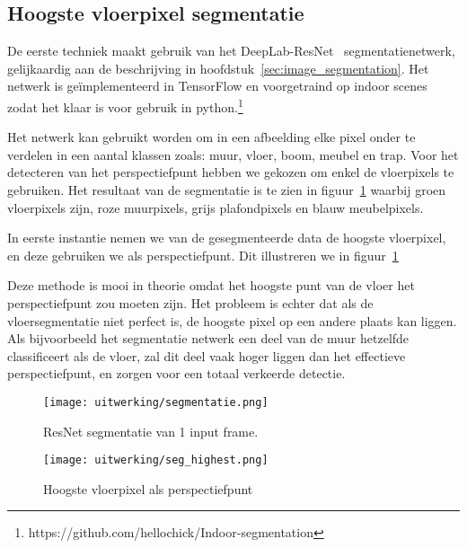 \subsection{Hoogste vloerpixel segmentatie}\label{sec:seg_highest}

De eerste techniek maakt gebruik van het DeepLab-ResNet~\cite{resnet101} segmentatienetwerk, gelijkaardig aan de beschrijving in hoofdstuk~\ref{sec:image_segmentation}.
Het netwerk is ge\"{i}mplementeerd in TensorFlow en voorgetraind op indoor scenes zodat het klaar is voor gebruik in python.\footnote{https://github.com/hellochick/Indoor-segmentation}

Het netwerk kan gebruikt worden om in een afbeelding elke pixel onder te verdelen in een aantal klassen zoals: muur, vloer, boom, meubel en trap.
Voor het detecteren van het perspectiefpunt hebben we gekozen om enkel de vloerpixels te gebruiken.
Het resultaat van de segmentatie is te zien in figuur~\ref{fig:floor_seg} waarbij groen vloerpixels zijn, roze muurpixels, grijs plafondpixels en blauw meubelpixels.

In eerste instantie nemen we van de gesegmenteerde data de hoogste vloerpixel, en deze gebruiken we als perspectiefpunt.
Dit illustreren we in figuur~\ref{fig:floor_seg}

Deze methode is mooi in theorie omdat het hoogste punt van de vloer het perspectiefpunt zou moeten zijn.
Het probleem is echter dat als de vloersegmentatie niet perfect is, de hoogste pixel op een andere plaats kan liggen.
Als bijvoorbeeld het segmentatie netwerk een deel van de muur hetzelfde classificeert als de vloer, zal dit deel vaak hoger liggen dan het
effectieve perspectiefpunt, en zorgen voor een totaal verkeerde detectie.

\begin{figure}
    \centering
    \texttt{[image: uitwerking/segmentatie.png]}
    \caption{ResNet segmentatie van 1 input frame.}
    \label{fig:floor_seg}
\end{figure}
\begin{figure}
    \centering
    \texttt{[image: uitwerking/seg\_highest.png]}
    \caption{Hoogste vloerpixel als perspectiefpunt}
    \label{fig:highest_pixel}
\end{figure}


